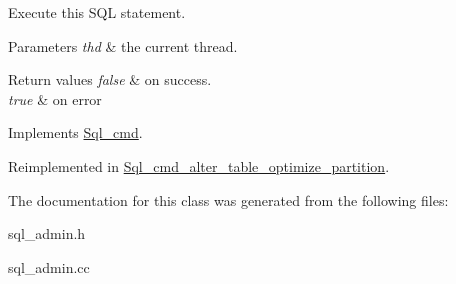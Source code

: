 Execute this S\+QL statement. 
\begin{DoxyParams}{Parameters}
{\em thd} & the current thread. \\
\hline
\end{DoxyParams}

\begin{DoxyRetVals}{Return values}
{\em false} & on success. \\
\hline
{\em true} & on error \\
\hline
\end{DoxyRetVals}


Implements \mbox{\hyperlink{classSql__cmd_a213367b79b551296fbb7790f2a3732fb}{Sql\+\_\+cmd}}.



Reimplemented in \mbox{\hyperlink{classSql__cmd__alter__table__optimize__partition_a16ec9cb4ba62fbc49842abd1044bdc2a}{Sql\+\_\+cmd\+\_\+alter\+\_\+table\+\_\+optimize\+\_\+partition}}.



The documentation for this class was generated from the following files\+:\begin{DoxyCompactItemize}
\item 
sql\+\_\+admin.\+h\item 
sql\+\_\+admin.\+cc\end{DoxyCompactItemize}
